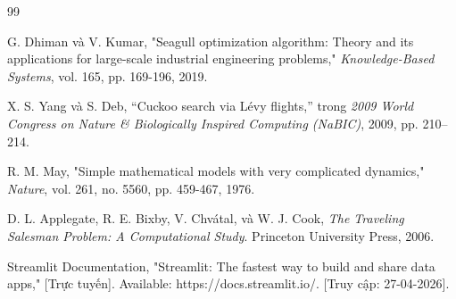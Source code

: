 \documentclass[12pt, a4paper]{article}
\begin{document}
\newpage
\renewcommand{\refname}{Tài liệu tham khảo}
\begin{thebibliography}{99}

 G. Dhiman và V. Kumar, "Seagull optimization algorithm: Theory and its applications for large-scale industrial engineering problems," \textit{Knowledge-Based Systems}, vol. 165, pp. 169-196, 2019.

 X. S. Yang và S. Deb, ``Cuckoo search via Lévy flights,'' trong \textit{2009 World Congress on Nature \& Biologically Inspired Computing (NaBIC)}, 2009, pp. 210--214.

 R. M. May, "Simple mathematical models with very complicated dynamics," \textit{Nature}, vol. 261, no. 5560, pp. 459-467, 1976.

 D. L. Applegate, R. E. Bixby, V. Chvátal, và W. J. Cook, \textit{The Traveling Salesman Problem: A Computational Study}. Princeton University Press, 2006.

 Streamlit Documentation, "Streamlit: The fastest way to build and share data apps," [Trực tuyến]. Available: https://docs.streamlit.io/. [Truy cập: 27-04-2026].

\end{thebibliography}

\newpage
\appendix
\end{document}
